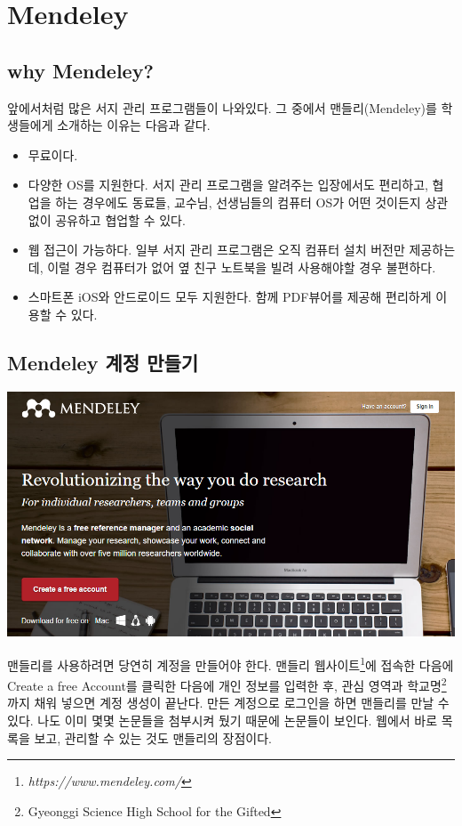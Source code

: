 \documentclass[11pt]{article}
\begin{document}
\newpage
	
 
\section{Mendeley}
\subsection{why Mendeley?}
앞에서처럼 많은 서지 관리 프로그램들이 나와있다. 그 중에서 맨들리(Mendeley)를 학생들에게 소개하는 이유는 다음과 같다.
\begin{itemize}
	\item 무료이다. 
	\item 다양한 OS를 지원한다. 서지 관리 프로그램을 알려주는 입장에서도 편리하고, 협업을 하는 경우에도 동료들, 교수님, 선생님들의 컴퓨터 OS가 어떤 것이든지 상관없이 공유하고 협업할 수 있다.
	\item 웹 접근이 가능하다. 일부 서지 관리 프로그램은 오직 컴퓨터 설치 버전만 제공하는데, 이럴 경우 컴퓨터가 없어 옆 친구 노트북을 빌려 사용해야할 경우 불편하다.
	\item 스마트폰 iOS와 안드로이드 모두 지원한다. 함께 PDF뷰어를 제공해 편리하게 이용할 수 있다.
\end{itemize}  \par
\subsection{Mendeley 계정 만들기}
\begin{center}
	\includegraphics[width=14cm]{./image/account2.png}
\end{center}
맨들리를 사용하려면 당연히 계정을 만들어야 한다. 맨들리 웹사이트\footnote{\textit{https://www.mendeley.com/}}에 접속한 다음에 \textrm{Create a free Account}를 클릭한 다음에 개인 정보를 입력한 후, 관심 영역과 학교명\footnote{Gyeonggi Science High School for the Gifted}까지 채워 넣으면 계정 생성이 끝난다. 만든 계정으로 로그인을 하면 맨들리를 만날 수 있다. 나도 이미 몇몇 논문들을 첨부시켜 뒀기 때문에 논문들이 보인다. 웹에서 바로 목록을 보고, 관리할 수 있는 것도 맨들리의 장점이다.
\end{document}
